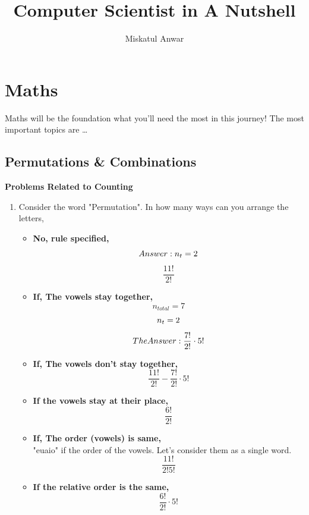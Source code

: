 \documentclass{book}
\title{Computer Scientist in A Nutshell}
\author{Miskatul Anwar}
\begin{document}
\maketitle
\newpage
\chapter{Maths}

Maths will be the foundation what you'll need the most in this journey!
The most important topics are \dots
\section{Permutations \& Combinations}
\textbf{Problems Related to Counting}
\begin{enumerate}
	\item Consider the word "Permutation". In how many ways can you arrange the letters,\\
	      \begin{itemize}
		      \item \textbf{No, rule specified,}\\
		            \[
			            Answer: \space n_t=2
		            \]
		            \[
			            \frac{11!}{2!}
		            \]
		      \item \textbf{If, The vowels stay together,\\}
		            \[
			            n_{total} = 7
		            \]
		            \[
			            n_t=2\\
		            \]
		            \[
			            The \space Answer:\space \frac{7!}{2!}\cdot 5!
		            \]
		      \item \textbf{If, The vowels don't stay together,\\}
		            \[
			            \frac{11!}{2!}-\frac{7!}{2!}\cdot 5!
		            \]
		      \item \textbf{If the vowels stay at their place,}\\
		            \[
			            \frac{6!}{2!}
		            \]
		      \item \textbf{If, The order (vowels) is same,}\\
		            "euaio" if the order of the vowels. Let's consider them as a single word.
		            \[
			            \frac{11!}{2!5!}
		            \]
		      \item \textbf{If the relative order is the same,}\\
		            \[
			            \frac{6!}{2!}\cdot 5!
		            \]

\end{itemize}
\end{enumerate}
\end{document}
